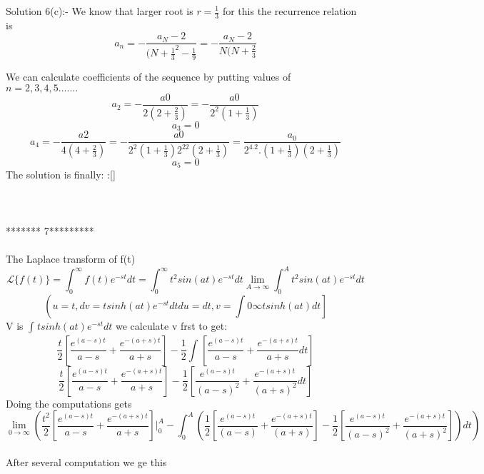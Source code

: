 \documentclass[onecolumn]{IEEEtran}
\begin{document}
Solution 6(c):-
We know that larger root is $r=\frac{1}{3}$
for this the recurrence relation is
\begin{equation}
    a_n=-\frac{a_N-2}{(N+\frac{1}{3}^2-\frac{1}{9}}=-\frac{a_N-2}{N(N+\frac{2}{3}}
\end{equation}

We can calculate coefficients of the sequence by putting values of $n=2,3,4,5.......$
\begin{equation}
    a_2=-\frac{a0}{2(2+
    \frac{2}{3})}=-\frac{a0}{2^2(1+
    \frac{1}{3})}
   \end{equation}
   \begin{equation}
    a_3=0
    \end{equation}
    \begin{equation}
    a_4=-\frac{a2}{4(4+
    \frac{2}{3})}=-\frac{a0}{2^2(1+
    \frac{1}{3})2^22(2+\frac{1}{3})}=\frac{a_0}{2^4.2.(1+\frac{1}{3})(2+\frac{1}{3})}
    \end{equation}
    \begin{equation}
    a_5=0
\end{equation}
The solution is finally: :[]
\\
\\
\\
\\
******* 7*********
\\
\\
The Laplace transform of f(t)
\begin{equation}
    
\mathscr{L}\{f(t)\}=\int_{0}^{\infty}f(t)e^{-st}dt=\int_{0}^{\infty}t^2sin(at)e^{-st}dt
\lim_{A\to\infty}\int_{0}^{A}t^{2}sin(at)e^{-st}dt
\label{int}
\label{lim}

\end{equation}
\begin{equation}
\left(  u=t  ,  dv=tsinh(at)e^{-st}dt 
    du=dt ,           v=\int{0}{\infty}tsinh(at)dt  \right]
\end{equation}
V is $\int_{}{}tsinh(at)e^{-st}dt$
we calculate v frst to get:
\begin{equation}
    \frac{t}{2}\left[ \frac{e^{(a-s)t}}{a-s}+\frac{e^{-(a+s)t}}{a+s}\right]- \frac{1}{2}\int_{}{}\left[\frac{e^{(a-s)t}}{a-s}+\frac{e^{-(a+s)t}}{a+s}dt\right]
\end{equation}
\begin{equation}
    \frac{t}{2}\left[ \frac{e^{(a-s)t}}{a-s}+\frac{e^{-(a+s)t}}{a+s}\right]- \frac{1}{2} \left[\frac{e^{(a-s)t}}{(a-s)^2}+\frac{e^{-(a+s)t}}{(a+s)^2}dt\right]
\end{equation}
Doing the computations gets
\begin{equation}
\lim_{0\to \infty}
\left(
\frac{t^2}{2}
\left[ 
\frac{e^{(a-s)t}}{a-s}+\frac{e^{-(a+s)t}}{a+s}
\right]
\Big|_0^A
-\int_{0}^{A}
\left(\frac{1}{2}
\left[\frac{e^{(a-s)t}}{(a-s)}
+\frac{e^{-(a+s)t}}{(a+s)}\right]
-\frac{1}{2}
\left[\frac{e^{(a-s)t}}{(a-s)^2}
+\frac{e^{-(a+s)t}}{(a+s)^2}\right]\right)dt\right)
\end{equation}
\\After several 
computation we 
ge 
this 
\end{document}
